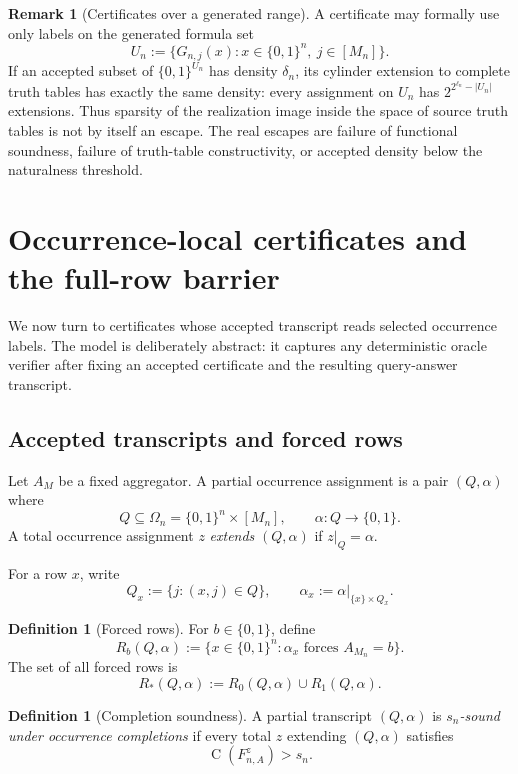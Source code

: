 \documentclass[11pt]{article}
\theoremstyle{definition}
\newtheorem{definition}[theorem]{Definition}
\newtheorem{remark}[theorem]{Remark}
\newcommand{\bits}{\{0,1\}}
\newcommand{\Ckt}{\operatorname{C}}
\begin{document}
\begin{remark}[Certificates over a generated range]\label{rem:cylinder}
A certificate may formally use only labels on the generated formula set
\[
  U_n:=\{G_{n,j}(x):x\in\bits^n,\ j\in[M_n]\}.
\]
If an accepted subset of $\bits^{U_n}$ has density $\delta_n$, its cylinder extension to complete truth tables has exactly the same density: every assignment on $U_n$ has $2^{2^{\ell_n}-|U_n|}$ extensions. Thus sparsity of the realization image inside the space of source truth tables is not by itself an escape. The real escapes are failure of functional soundness, failure of truth-table constructivity, or accepted density below the naturalness threshold.
\end{remark}

\section{Occurrence-local certificates and the full-row barrier}\label{sec:rowforcing}

We now turn to certificates whose accepted transcript reads selected occurrence labels. The model is deliberately abstract: it captures any deterministic oracle verifier after fixing an accepted certificate and the resulting query-answer transcript.

\subsection{Accepted transcripts and forced rows}

Let $A_M$ be a fixed aggregator. A partial occurrence assignment is a pair $(Q,\alpha)$ where
\[
  Q\subseteq\Omega_n=\bits^n\times[M_n],
  \qquad
  \alpha:Q\to\bits.
\]
A total occurrence assignment $z$ \emph{extends} $(Q,\alpha)$ if $z|_Q=\alpha$.

For a row $x$, write
\[
  Q_x:=\{j:(x,j)\in Q\},
  \qquad
  \alpha_x:=\alpha|_{\{x\}\times Q_x}.
\]

\begin{definition}[Forced rows]\label{def:forced-rows}
For $b\in\bits$, define
\[
  R_b(Q,\alpha)
  :=\{x\in\bits^n:\alpha_x\text{ forces }A_{M_n}=b\}.
\]
The set of all forced rows is
\[
  R_*(Q,\alpha):=R_0(Q,\alpha)\cup R_1(Q,\alpha).
\]
\end{definition}

\begin{definition}[Completion soundness]\label{def:completion-soundness}
A partial transcript $(Q,\alpha)$ is \emph{$s_n$-sound under occurrence completions} if every total $z$ extending $(Q,\alpha)$ satisfies
\begin{equation}\label{eq:completion-soundness}
  \Ckt(F_{n,A}^z)>s_n.
\end{equation}
\end{definition}
\end{document}
